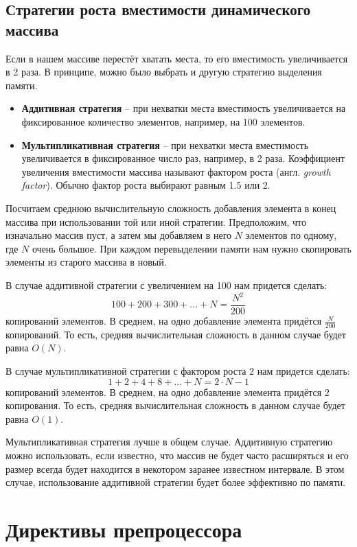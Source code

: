 \documentclass[10pt]{article}
\begin{document}
\subsection*{Стратегии роста вместимости динамического массива}
Если в нашем массиве перестёт хватать места, то его вместимость увеличивается в 2 раза. В принципе, можно было выбрать и другую стратегию выделения памяти.

\begin{itemize}
\item \textbf{Аддитивная стратегия} -- при нехватки места вместимость увеличивается на фиксированное количество элементов, например, на 100 элементов.
\item \textbf{Мультипликативная стратегия} -- при нехватки места вместимость увеличивается в фиксированное число раз, например, в 2 раза. Коэффициент увеличения вместимости массива называют фактором роста (англ. \textit{growth factor}). Обычно фактор роста выбирают равным 1.5 или 2.
\end{itemize}
Посчитаем среднюю вычислительную сложность добавления элемента в конец массива при использовании той или иной стратегии. Предположим, что изначально массив пуст, а затем мы добавляем в него $N$ элементов по одному, где $N$ очень большое. При каждом перевыделении памяти нам нужно скопировать элементы из старого массива в новый. 

В случае аддитивной стратегии с увеличением на 100 нам придется сделать:
$$
100 + 200 + 300 + ... + N = \frac{N^2}{200} 
$$
копирований элементов. В среднем, на одно добавление элемента придётся $\frac{N}{200}$ копирований. То есть, средняя вычислительная сложность в данном случае будет равна $O(N)$.

В случае мультипликативной стратегии с фактором роста 2 нам придется сделать:
$$
1 + 2 + 4 + 8 + ... + N = 2 \cdot N - 1
$$
копирований элементов. В среднем, на одно добавление элемента придётся $2$ копирования. То есть, средняя вычислительная сложность в данном случае будет равна $O(1)$.

Мультипликативная стратегия лучше в общем случае. Аддитивную стратегию можно использовать, если известно, что массив не будет часто расширяться и его размер всегда будет находится в некотором заранее известном интервале. В этом случае, использование аддитивной стратегии будет более эффективно по памяти.


\newpage
\section*{Директивы препроцессора}
\end{document}
